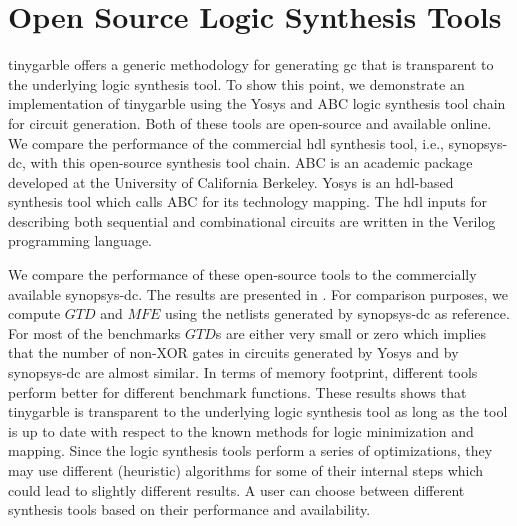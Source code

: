 \chapter{Open Source Logic Synthesis Tools}\label{chap:open-source}
\gls{tinygarble} offers a generic methodology for generating \acrshort{gc} that is transparent to the underlying logic synthesis tool.
To show this point, we demonstrate an implementation of \gls{tinygarble} using the Yosys \cite{tool:Yosys} and ABC \cite{tool:ABC} logic synthesis tool chain for circuit generation.
Both of these tools are open-source and available online.
We compare the performance of the commercial \acrshort{hdl} synthesis tool, i.e., \gls{synopsys-dc}, with this open-source synthesis tool chain.
ABC is an academic package developed at the University of California Berkeley.
Yosys is an \acrshort{hdl}-based synthesis tool which calls ABC for its technology mapping.
The \acrshort{hdl} inputs for describing both sequential and combinational circuits are written in the Verilog programming language.

We compare the performance of these open-source tools to the commercially available \gls{synopsys-dc}.
The results are presented in .
For comparison purposes, we compute $\mathit{GTD}$ and $\mathit{MFE}$ using the netlists generated by \gls{synopsys-dc} as reference.
For most of the benchmarks $\mathit{GTD}$s are either very small or zero which implies that the number of non-XOR gates in circuits generated by Yosys and by \gls{synopsys-dc} are almost similar.
In terms of memory footprint, different tools perform better for different benchmark functions.
These results shows that \gls{tinygarble} is transparent to the underlying logic synthesis tool as long as the tool is up to date with respect to the known methods for logic minimization and mapping.
Since the logic synthesis tools perform a series of optimizations, they may use different (heuristic) algorithms for some of their internal steps which could lead to slightly different results.
A user can choose between different synthesis tools based on their performance and availability.


